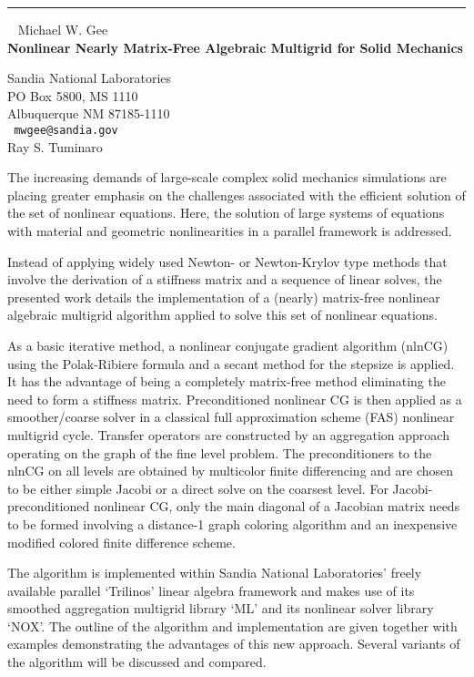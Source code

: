 \documentclass{report}
\begin{document}
\begin{center}

\rule{6in}{1pt} \
{\large
Michael W. Gee
\\ {\bf
Nonlinear Nearly Matrix-Free Algebraic Multigrid for Solid Mechanics
}}

Sandia National Laboratories
\\
PO Box 5800, MS 1110
\\
Albuquerque  NM  87185-1110
\\ {\tt
mwgee@sandia.gov
}
\\
Ray S. Tuminaro
\end{center}

The increasing demands of large-scale complex solid mechanics
simulations are placing greater emphasis on the challenges associated
with the efficient solution of the set of nonlinear equations. Here,
the solution of large systems of equations with material and geometric
nonlinearities in a parallel framework is addressed.


Instead of applying widely used Newton- or Newton-Krylov type methods
that involve the derivation of a stiffness matrix and a sequence of
linear solves, the presented work details the implementation of a
(nearly) matrix-free nonlinear algebraic multigrid algorithm applied to
solve this set of nonlinear equations.


As a basic iterative method, a nonlinear conjugate gradient algorithm
(nlnCG) using the Polak-Ribiere formula and a secant method for the
stepsize is applied. It has the advantage of being a completely
matrix-free method eliminating the need to form a stiffness matrix.
Preconditioned nonlinear CG is then applied as a smoother/coarse solver
in a classical full approximation scheme (FAS) nonlinear multigrid
cycle. Transfer operators are constructed by an aggregation approach
operating on the graph of the fine level problem. The preconditioners
to the nlnCG on all levels are obtained by multicolor finite
differencing and are chosen to be either simple Jacobi or a direct
solve on the coarsest level.
For Jacobi-preconditioned nonlinear CG, only the main diagonal of a
Jacobian matrix needs to be formed involving a distance-1 graph
coloring algorithm and an inexpensive modified colored finite
difference scheme.


The algorithm is implemented within Sandia National Laboratories'
freely available parallel `Trilinos' linear algebra framework and makes
use of its smoothed aggregation multigrid library `ML' and its
nonlinear solver library `NOX'. The outline of the algorithm and
implementation are given together with examples demonstrating the
advantages of this new approach. Several variants of the algorithm will
be discussed and compared. 
\end{document}
